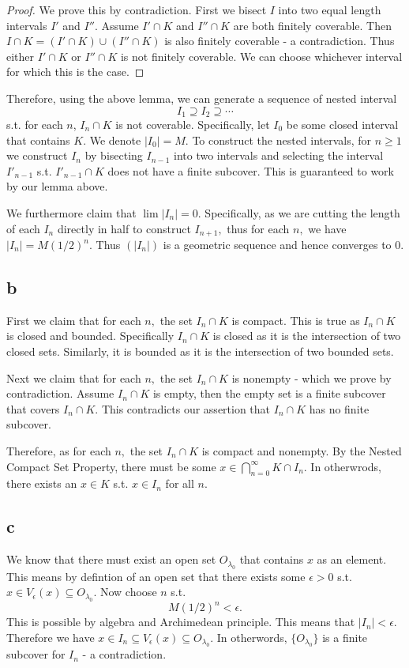 \documentclass[10pt]{article}
\begin{document}
\begin{proof}
    We prove this by contradiction. First we bisect $I$ into two equal length intervals $I'$ and $I''$. Assume $I'\cap K$ and $I''\cap K$ are both finitely coverable. Then $I\cap K = (I'\cap K)\cup(I''\cap K)$ is also finitely coverable - a contradiction. Thus either $I'\cap K$ or $I''\cap K$ is not finitely coverable. We can choose whichever interval for which this is the case.
\end{proof}

Therefore, using the above lemma, we can generate a sequence of nested interval
\[I_1\supseteq I_2\supseteq\cdots\]
s.t. for each $n$, $I_n\cap K$ is not coverable.
Specifically, let $I_0$ be some closed interval that contains $K.$ We denote $|I_0|=M.$ To construct the nested intervals, for $n\ge 1$ we construct $I_n$ by bisecting $I_{n-1}$ into two intervals and selecting the interval $I'_{n-1}$ s.t. $I'_{n-1}\cap K$ does not have a finite subcover. This is guaranteed to work by our lemma above.

We furthermore claim that $\lim |I_n| = 0.$ Specifically, as we are cutting the length of each $I_{n}$ directly in half to construct $I_{n+1},$ thus for each $n,$ we have $|I_n|=M(1/2)^n.$ Thus $(|I_n|)$ is a geometric sequence and hence converges to $0$.

\subsection*{b}

First we claim that for each $n,$ the set $I_n\cap K$ is compact. This is true as $I_n\cap K$ is closed and bounded. Specifically $I_n\cap K$ is closed as it is the intersection of two closed sets. Similarly, it is bounded as it is the intersection of two bounded sets.

Next we claim that for each $n,$ the set $I_n\cap K$ is nonempty - which we prove by contradiction. Assume $I_n\cap K$ is empty, then the empty set is a finite subcover that covers $I_n\cap K$. This contradicts our assertion that $I_n\cap K$ has no finite subcover.

Therefore, as for each $n,$ the set $I_n\cap K$ is compact and nonempty. By the Nested Compact Set Property, there must be some $x\in\bigcap_{n=0}^\infty K\cap I_n.$ In otherwrods, there exists an $x\in K$ s.t. $x\in I_n$ for all $n.$

\subsection*{c}
We know that there must exist an open set $O_{\lambda_0}$ that contains $x$ as an element. This means by defintion of an open set that there exists some $\epsilon > 0$ s.t. $x\in V_\epsilon(x)\subseteq O_{\lambda_0}.$ Now choose $n$ s.t.
\[M(1/2)^n < \epsilon.\]
This is possible by algebra and Archimedean principle. This means that $|I_n|<\epsilon.$ Therefore we have $x\in I_n \subseteq  V_\epsilon(x)\subseteq O_{\lambda_0}.$ In otherwords, $\{O_{\lambda_0}\}$ is a finite subcover for $I_n$ - a contradiction.
\end{document}
